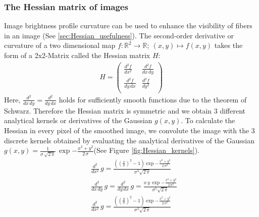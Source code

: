 \documentclass[12pt,english,twocolumn]{revtex4}
\begin{document}
\subsubsection{The Hessian matrix of images} \label{sec:Hessian}
Image brightness profile curvature can be used to enhance the visibility of fibers in an image (See \ref{sec:Hessian_usefulness}). The second-order derivative or curvature of a two dimensional map $f:\mathds{R}^{2}\to \mathds{R}; \ (x,y) \mapsto f(x,y)$ takes the form of a 2x2-Matrix called the Hessian matrix $H$: \\
\begin{align*}
 H = 
    \left(
    \begin{array}{rr}
        \frac{d^{2}f}{dx^{2}} & \frac{d^{2}f}{dx \, dy} \\
        \frac{d^{2}f}{dy \, dx} & \frac{d^{2}f}{dy^{2}} \\
    \end{array}
    \right)
\end{align*}
Here, $\frac{d^{2}}{dx \, dy} = \frac{d^{2}}{dy \, dx}$ holds for sufficiently smooth functions due to the theorem of Schwarz. Therefore the Hessian matrix is symmetric and we obtain 3 different analytical kernels or derivatives of the Gaussian $g(x,y)$. To calculate the Hessian in every pixel of the smoothed image, we convolute the image with the 3 discrete kernels obtained by evaluating the analytical derivatives of the Gaussian $g(x,y) = \frac{1}{\sigma \, \sqrt{2 \, \pi}} \, \exp{-\frac{x^2 + y^2}{2 \, \sigma}}$(See Figure \ref{fig:Hessian_kernels}).
\begin{align*}
    &\frac{d^{2}}{dx^{2}} \, g = \frac{\left( \left(\frac{x}{\sigma} \right)^{2} - 1\right)\exp{-\frac{x^{2} + y^{2}}{2 \, \sigma^{2}}}}{\sigma^{3} \sqrt{2 \, \pi}} \\
    &\frac{d^{2}}{dx \, dy} \, g = \frac{d^{2}}{dy \, dx} \, g = \frac{x \, y \, \exp{-\frac{x^{2} + y^{2}}{2 \, \sigma^{2}}}}{\sigma^{5} \sqrt{2 \, \pi}}  \\
    &\frac{d^{2}}{dx^{2}} \, g = \frac{\left( \left(\frac{y}{\sigma} \right)^{2} - 1\right)\exp{-\frac{x^{2} + y^{2}}{2 \, \sigma^{2}}}}{\sigma^{3} \sqrt{2 \, \pi}}  \\
\end{align*}
\end{document}

